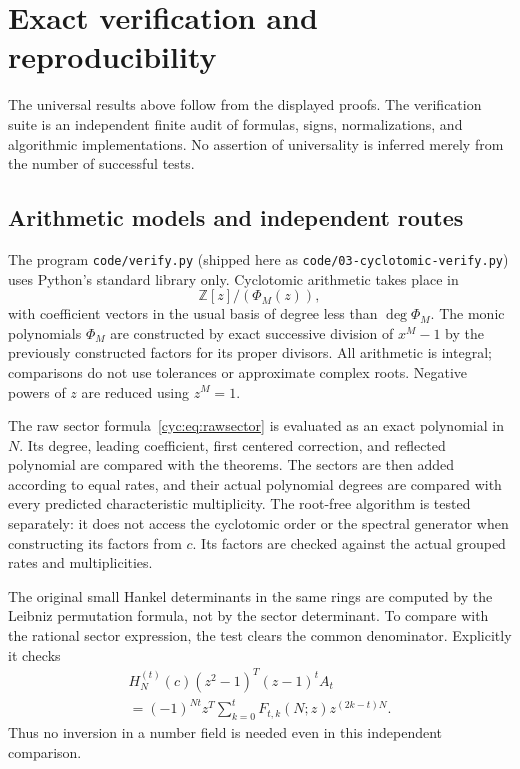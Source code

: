\documentclass[11pt,a4paper]{article}
\numberwithin{equation}{section}
\theoremstyle{definition}
\theoremstyle{remark}
\newcommand{\ZZ}{\mathbb Z}
\newcommand{\cH}[2]{H_{#1}^{(#2)}}
\begin{document}
\section{Exact verification and reproducibility}\label{cyc:sec:verification}

The universal results above follow from the displayed proofs.  The
verification suite is an independent finite audit of formulas, signs,
normalizations, and algorithmic implementations.  No assertion of
universality is inferred merely from the number of successful tests.

\subsection{Arithmetic models and independent routes}
The program \texttt{code/verify.py} (shipped here as
\nolinkurl{code/03-cyclotomic-verify.py}) uses Python's standard library only.
Cyclotomic arithmetic takes place in
\begin{equation}\label{cyc:eq:ring}
 \ZZ[z]/(\Phi_M(z)),
\end{equation}
with coefficient vectors in the usual basis of degree less than
$\deg\Phi_M$.  The monic polynomials $\Phi_M$ are constructed by exact
successive division of $x^M-1$ by the previously constructed factors
for its proper divisors.  All arithmetic is integral; comparisons do
not use tolerances or approximate complex roots.  Negative powers of
$z$ are reduced using $z^M=1$.

The raw sector formula~\eqref{cyc:eq:rawsector} is evaluated as an exact
polynomial in $N$.  Its degree, leading coefficient, first centered
correction, and reflected polynomial are compared with the theorems.
The sectors are then added according to equal rates, and their actual
polynomial degrees are compared with every predicted characteristic
multiplicity.  The root-free algorithm is tested separately: it does
not access the cyclotomic order or the spectral generator when
constructing its factors from $c$.  Its factors are checked against the
actual grouped rates and multiplicities.

The original small Hankel determinants in the same rings are computed
by the Leibniz permutation formula, not by the sector determinant.
To compare with the rational sector expression, the test clears the
common denominator.  Explicitly it checks
\begin{multline}\label{cyc:eq:divisionfreecheck}
 \cH Nt(c)(z^2-1)^T(z-1)^tA_t\\
 =(-1)^{Nt}z^T\sum_{k=0}^{t}F_{t,k}(N;z)z^{(2k-t)N}.
\end{multline}
Thus no inversion in a number field is needed even in this independent
comparison.
\end{document}
